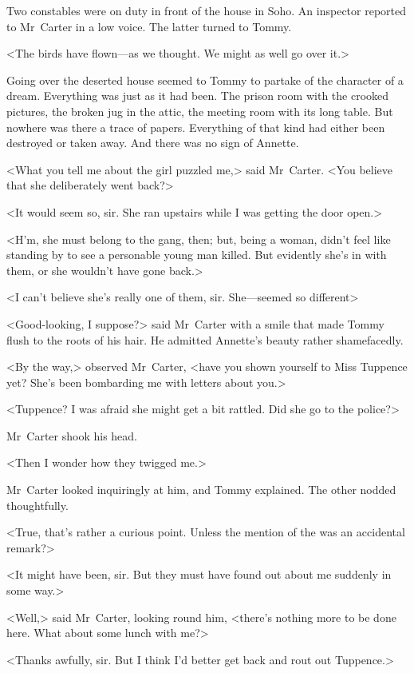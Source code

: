 Two constables were on duty in front of the house in Soho. An inspector reported to Mr~Carter in a low voice. The latter turned to Tommy.

<The birds have flown—as we thought. We might as well go over it.>

Going over the deserted house seemed to Tommy to partake of the character of a dream. Everything was just as it had been. The prison room with the crooked pictures, the broken jug in the attic, the meeting room with its long table. But nowhere was there a trace of papers. Everything of that kind had either been destroyed or taken away. And there was no sign of Annette.

<What you tell me about the girl puzzled me,> said Mr~Carter. <You believe that she deliberately went back?>

<It would seem so, sir. She ran upstairs while I was getting the door open.>

<H'm, she must belong to the gang, then; but, being a woman, didn't feel like standing by to see a personable young man killed. But evidently she's in with them, or she wouldn't have gone back.>

<I can't believe she's really one of them, sir. She—seemed so different\longdash>

<Good-looking, I suppose?> said Mr~Carter with a smile that made Tommy flush to the roots of his hair. He admitted Annette's beauty rather shamefacedly.

<By the way,> observed Mr~Carter, <have you shown yourself to Miss Tuppence yet? She's been bombarding me with letters about you.>

<Tuppence? I was afraid she might get a bit rattled. Did she go to the police?>

Mr~Carter shook his head.

<Then I wonder how they twigged me.>

Mr~Carter looked inquiringly at him, and Tommy explained. The other nodded thoughtfully.

<True, that's rather a curious point. Unless the mention of the  was an accidental remark?>

<It might have been, sir. But they must have found out about me suddenly in some way.>

<Well,> said Mr~Carter, looking round him, <there's nothing more to be done here. What about some lunch with me?>

<Thanks awfully, sir. But I think I'd better get back and rout out Tuppence.>

